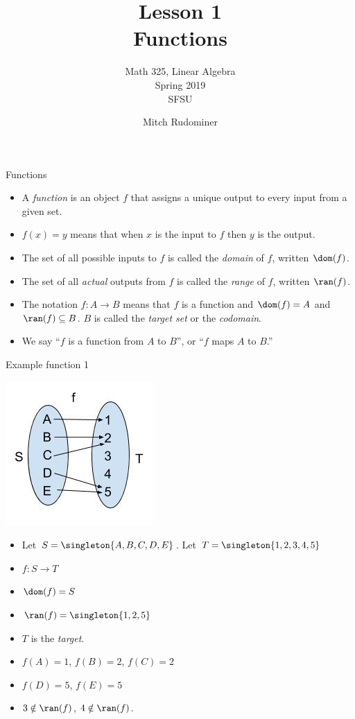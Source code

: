 \documentclass{beamer}
\title{Lesson 1 \\ Functions}
\subtitle{Math 325, Linear Algebra \\ Spring 2019 \\ SFSU}
\author{Mitch Rudominer}
\date{}
\begin{document}
\begin{frame}
  \titlepage
\end{frame}


\begin{frame}{Functions}

  \begin{itemize}
  \item  A \emph{function} is an object $f$ that assigns a unique output
  to every input from a given set.
  \item $f(x) = y$ means that when $x$ is the input to $f$ then $y$ is the output.
  \item The set of all possible inputs to $f$ is called the \emph{domain} of $f$,
  written $\dom(f)$.
  \item The set of all \emph{actual} outputs from $f$ is called the \emph{range} of $f$,
  written $\ran(f)$.
  \item The notation $f:A \to B$ means that $f$ is a function and
  $\dom(f)=A$ and $\ran(f)\subseteq B$. $B$ is called the \emph{target set}
  or the \emph{codomain}.
  \item We say ``$f$ is a function from $A$ to $B$'', or ``$f$ maps $A$ to $B$.''
  \end{itemize}


\end{frame}

\begin{frame}{Example function 1}
\begin{center}
\includegraphics[scale=0.25]{function1}
\end{center}

\begin{itemize}
\item Let $S=\singleton{A,B,C,D,E}$. Let $T=\singleton{1,2,3,4,5}$
\item $f:S\to T$
\item $\dom(f) = S$
\item $\ran(f) = \singleton{1,2,5}$
\item $T$ is the \emph{target}.
\item $f(A) = 1$, $f(B) = 2$, $f(C)=2$
\item $f(D) = 5$, $f(E) = 5$
\item $3 \notin \ran(f)$, $4\notin\ran(f)$.
\end{itemize}
\end{frame}
\end{document}
